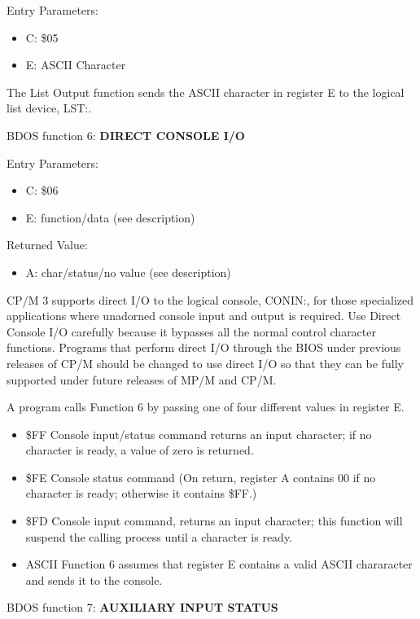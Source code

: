 Entry Parameters:
\begin{itemize}
\item[] C: \$05
\item[] E: ASCII Character
\end{itemize}

The List Output function sends the ASCII character in register E to
the logical list device, LST:.

BDOS function 6: \textbf{DIRECT CONSOLE I/O}

Entry Parameters:
\begin{itemize}
\item[] C: \$06
\item[] E: function/data (see description)
\end{itemize}

Returned Value:
\begin{itemize}
\item[] A: char/status/no value (see description)
\end{itemize}

CP/M 3 supports direct I/O to the logical console, CONIN:, for those
specialized applications where unadorned console input and output is
required. Use Direct Console I/O carefully because it bypasses all the
normal control character functions.  Programs that perform direct I/O
through the BIOS under previous releases of CP/M should be changed to
use direct I/O so that they can be fully supported under future
releases of MP/M and CP/M.

A program calls Function 6 by passing one of four different values in
register E.

\begin{itemize}
\item \$FF Console input/status command returns an input character; if
  no character is ready, a value of zero is returned.
\item \$FE Console status command (On return, register A contains 00
  if no character is ready; otherwise it contains \$FF.)
\item \$FD Console input command, returns an input character; this
  function will suspend the calling process until a character is
  ready.
\item ASCII Function 6 assumes that register E contains a valid ASCII
  chararacter and sends it to the console.
\end{itemize}

BDOS function 7: \textbf{AUXILIARY INPUT STATUS}

